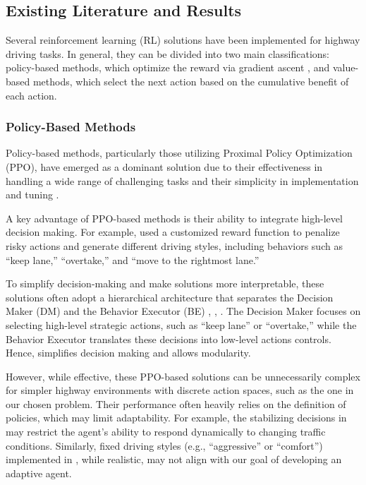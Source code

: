 \documentclass{article}
\begin{document}
\subsection{Existing Literature and Results}
Several reinforcement learning (RL) solutions have been implemented for highway driving tasks. In general, they can be divided into two main classifications: policy-based methods, which optimize the reward via gradient ascent \citep{sutton_policy_1999}, and value-based methods, which select the next action based on the cumulative benefit of each action. %

\subsubsection{Policy-Based Methods}
\label{sec: related-work}
Policy-based methods, particularly those utilizing Proximal Policy Optimization (PPO), have emerged as a dominant solution due to their effectiveness in handling a wide range of challenging tasks and their simplicity in implementation and tuning \citep{schulman_proximal_2017}. 

A key advantage of PPO-based methods is their ability to integrate high-level decision making. For example, \citep{forneris_implementing_2023} used a customized reward function to penalize risky actions and generate different driving styles, including behaviors such as “keep lane,” “overtake,” and “move to the rightmost lane.” 

To simplify decision-making and make solutions more interpretable, these solutions often adopt a hierarchical architecture that separates the Decision Maker (DM) and the Behavior Executor (BE) \citep{pighetti_high-level_2022}, \citep{forneris_implementing_2023}, \citep{capello_investigating_2023}.
The Decision Maker focuses on selecting high-level strategic actions, such as “keep lane” or “overtake,” while the Behavior Executor translates these decisions into low-level actions controls. Hence, simplifies decision making and allows modularity.

However, while effective, these PPO-based solutions can be unnecessarily complex for simpler highway environments with discrete action spaces, such as the one in our chosen problem. Their performance often heavily relies on the definition of policies, which may limit adaptability. For example, the stabilizing decisions in \citep{pighetti_high-level_2022} may restrict the agent's ability to respond dynamically to changing traffic conditions. Similarly, fixed driving styles (e.g., “aggressive” or “comfort”) implemented in \citep{forneris_implementing_2023}, while realistic, may not align with our goal of developing an adaptive agent.
\end{document}
